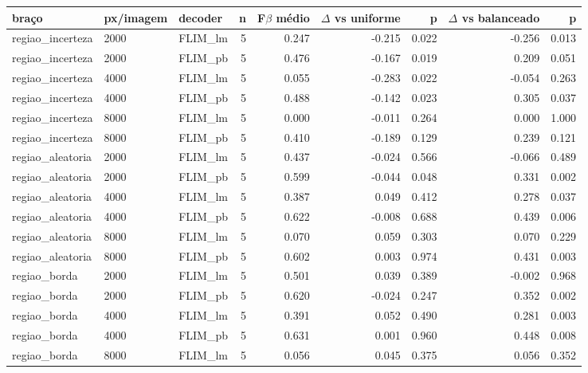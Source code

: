 \begin{tabular}{lllrrrrrr}
\hline
braço & px/imagem & decoder & n & F$\beta$ médio & $\Delta$ vs uniforme & p & $\Delta$ vs balanceado & p  \\
\hline
regiao\_incerteza & 2000 & FLIM\_lm & 5 & 0.247 & -0.215 & 0.022 & -0.256 & 0.013 \\
regiao\_incerteza & 2000 & FLIM\_pb & 5 & 0.476 & -0.167 & 0.019 & 0.209 & 0.051 \\
regiao\_incerteza & 4000 & FLIM\_lm & 5 & 0.055 & -0.283 & 0.022 & -0.054 & 0.263 \\
regiao\_incerteza & 4000 & FLIM\_pb & 5 & 0.488 & -0.142 & 0.023 & 0.305 & 0.037 \\
regiao\_incerteza & 8000 & FLIM\_lm & 5 & 0.000 & -0.011 & 0.264 & 0.000 & 1.000 \\
regiao\_incerteza & 8000 & FLIM\_pb & 5 & 0.410 & -0.189 & 0.129 & 0.239 & 0.121 \\
regiao\_aleatoria & 2000 & FLIM\_lm & 5 & 0.437 & -0.024 & 0.566 & -0.066 & 0.489 \\
regiao\_aleatoria & 2000 & FLIM\_pb & 5 & 0.599 & -0.044 & 0.048 & 0.331 & 0.002 \\
regiao\_aleatoria & 4000 & FLIM\_lm & 5 & 0.387 & 0.049 & 0.412 & 0.278 & 0.037 \\
regiao\_aleatoria & 4000 & FLIM\_pb & 5 & 0.622 & -0.008 & 0.688 & 0.439 & 0.006 \\
regiao\_aleatoria & 8000 & FLIM\_lm & 5 & 0.070 & 0.059 & 0.303 & 0.070 & 0.229 \\
regiao\_aleatoria & 8000 & FLIM\_pb & 5 & 0.602 & 0.003 & 0.974 & 0.431 & 0.003 \\
regiao\_borda & 2000 & FLIM\_lm & 5 & 0.501 & 0.039 & 0.389 & -0.002 & 0.968 \\
regiao\_borda & 2000 & FLIM\_pb & 5 & 0.620 & -0.024 & 0.247 & 0.352 & 0.002 \\
regiao\_borda & 4000 & FLIM\_lm & 5 & 0.391 & 0.052 & 0.490 & 0.281 & 0.003 \\
regiao\_borda & 4000 & FLIM\_pb & 5 & 0.631 & 0.001 & 0.960 & 0.448 & 0.008 \\
regiao\_borda & 8000 & FLIM\_lm & 5 & 0.056 & 0.045 & 0.375 & 0.056 & 0.352 \\

\end{tabular}
